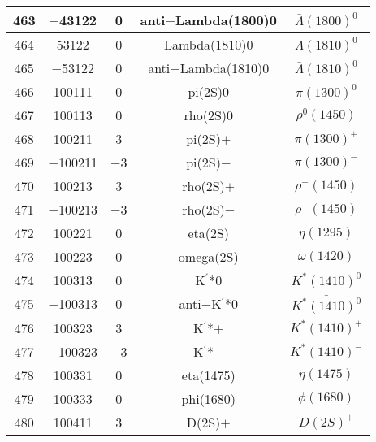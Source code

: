 \documentclass{article}
\begin{document}
\begin{table}[!htbp]
\begin{tabular}{|c|c|c|c|c|}
463 & $-$43122 & 0 & anti$-$Lambda(1800)0 & $\bar{\Lambda}(1800)^{0}$ \\
\hline
464 & 53122 & 0 & Lambda(1810)0 & $\Lambda(1810)^{0}$ \\
\hline
465 & $-$53122 & 0 & anti$-$Lambda(1810)0 & $\bar{\Lambda}(1810)^{0}$ \\
\hline
466 & 100111 & 0 & pi(2S)0 & $\pi(1300)^{0}$ \\
\hline
467 & 100113 & 0 & rho(2S)0 & $\rho^{0}(1450)$ \\
\hline
468 & 100211 & 3 & pi(2S)$+$ & $\pi(1300)^{+}$ \\
\hline
469 & $-$100211 & $-$3 & pi(2S)$-$ & $\pi(1300)^{-}$ \\
\hline
470 & 100213 & 3 & rho(2S)$+$ & $\rho^{+}(1450)$ \\
\hline
471 & $-$100213 & $-$3 & rho(2S)$-$ & $\rho^{-}(1450)$ \\
\hline
472 & 100221 & 0 & eta(2S) & $\eta(1295)$ \\
\hline
473 & 100223 & 0 & omega(2S) & $\omega(1420)$ \\
\hline
474 & 100313 & 0 & K$^{\prime}$*0 & $K^{*}(1410)^{0}$ \\
\hline
475 & $-$100313 & 0 & anti$-$K$^{\prime}$*0 & $\bar{K^{*}(1410)^{0}}$ \\
\hline
476 & 100323 & 3 & K$^{\prime}$*$+$ & $K^{*}(1410)^{+}$ \\
\hline
477 & $-$100323 & $-$3 & K$^{\prime}$*$-$ & $K^{*}(1410)^{-}$ \\
\hline
478 & 100331 & 0 & eta(1475) & $\eta(1475)$ \\
\hline
479 & 100333 & 0 & phi(1680) & $\phi(1680)$ \\
\hline
480 & 100411 & 3 & D(2S)$+$ & $D(2S)^{+}$ \\
\hline
\end{tabular}
\end{table}

\clearpage
\end{document}
